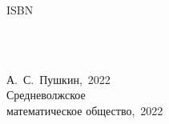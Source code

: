 	\vfill
	\parbox{16.5cm}{
		\parbox{7.5cm}{
			\vspace{-0.5cm}\hspace{-0.6cm}ISBN \zhrvISBN\\
		}
		\parbox{0.7cm}{
			\textcopyright \\
			\textcopyright \\
		}
		\parbox{9cm}{
			А.~С.~Пушкин,~2022 \\
			Средневолжское \\математи\-ческое общество,~2022
		}	
	}

	\vfill	

